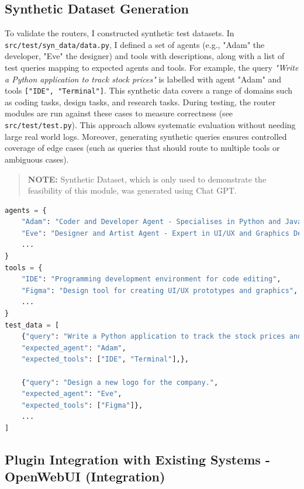 \subsection{Synthetic Dataset Generation}
\label{synthetic dataset generation}
To validate the routers, I constructed synthetic test datasets. In \texttt{src/test/syn\_data/data.py}, I defined a set of agents (e.g., "Adam" the developer, "Eve" the designer) and tools with descriptions, along with a list of test queries mapping to expected agents and tools. For example, the query \textit{"Write a Python application to track stock prices"} is labelled with agent "Adam" and tools \texttt{["IDE", "Terminal"]}. This synthetic data covers a range of domains such as coding tasks, design tasks, and research tasks. During testing, the router modules are run against these cases to measure correctness (see \texttt{src/test/test.py}). This approach allows systematic evaluation without needing large real world logs. Moreover, generating synthetic queries ensures controlled coverage of edge cases (such as queries that should route to multiple tools or ambiguous cases).

\begin{quote}
\textbf{NOTE:} Synthetic Dataset, which is only used to demonstrate the feasibility of this module, was generated using Chat GPT.
\end{quote}

\begin{lstlisting}[language=Python, caption={Example of the synthetic dataset}, breaklines=true]
agents = {
    "Adam": "Coder and Developer Agent - Specialises in Python and JavaScript development; creates scripts and applications.",
    "Eve": "Designer and Artist Agent - Expert in UI/UX and Graphics Design; produces content.",
    ...
}
tools = {
    "IDE": "Programming development environment for code editing",
    "Figma": "Design tool for creating UI/UX prototypes and graphics",
    ...
}
test_data = [
    {"query": "Write a Python application to track the stock prices and generate a report.",
    "expected_agent": "Adam",
    "expected_tools": ["IDE", "Terminal"],},

    {"query": "Design a new logo for the company.",
    "expected_agent": "Eve",
    "expected_tools": ["Figma"]},
    ...
]

\end{lstlisting}

\subsection{Plugin Integration with Existing Systems - OpenWebUI (Integration)}

